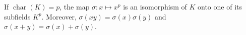 If $\operatorname{char}(K) = p$, the map $\sigma: x \mapsto x^p$ is an isomorphism of $K$ onto one of its subfields $K^p$. Moreover, $\sigma(xy) = \sigma(x)\sigma(y)$ and $\sigma(x+y) = \sigma(x) + \sigma(y)$.
